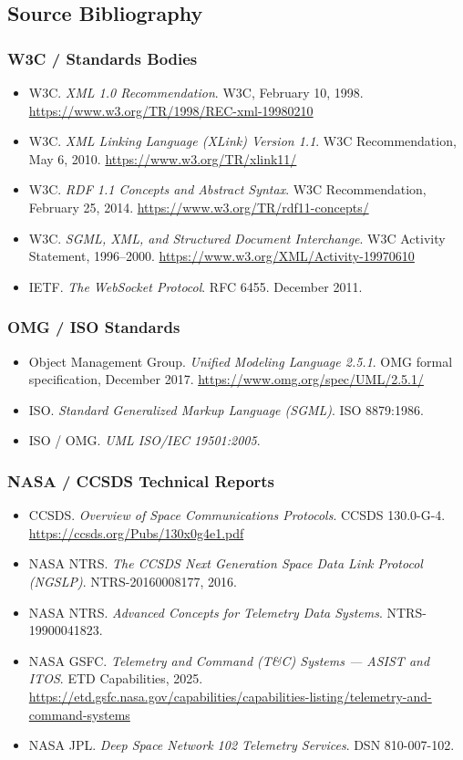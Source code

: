 \documentclass[11pt,letterpaper]{article}
\begin{document}
\subsection{Source Bibliography}

\subsubsection{W3C / Standards Bodies}
\begin{itemize}[noitemsep]
  \item W3C. \textit{XML 1.0 Recommendation}. W3C, February 10, 1998. \url{https://www.w3.org/TR/1998/REC-xml-19980210}
  \item W3C. \textit{XML Linking Language (XLink) Version 1.1}. W3C Recommendation, May 6, 2010. \url{https://www.w3.org/TR/xlink11/}
  \item W3C. \textit{RDF 1.1 Concepts and Abstract Syntax}. W3C Recommendation, February 25, 2014. \url{https://www.w3.org/TR/rdf11-concepts/}
  \item W3C. \textit{SGML, XML, and Structured Document Interchange}. W3C Activity Statement, 1996--2000. \url{https://www.w3.org/XML/Activity-19970610}
  \item IETF. \textit{The WebSocket Protocol}. RFC 6455. December 2011.
\end{itemize}

\subsubsection{OMG / ISO Standards}
\begin{itemize}[noitemsep]
  \item Object Management Group. \textit{Unified Modeling Language 2.5.1}. OMG formal specification, December 2017. \url{https://www.omg.org/spec/UML/2.5.1/}
  \item ISO. \textit{Standard Generalized Markup Language (SGML)}. ISO 8879:1986.
  \item ISO / OMG. \textit{UML ISO/IEC 19501:2005}.
\end{itemize}

\subsubsection{NASA / CCSDS Technical Reports}
\begin{itemize}[noitemsep]
  \item CCSDS. \textit{Overview of Space Communications Protocols}. CCSDS 130.0-G-4. \url{https://ccsds.org/Pubs/130x0g4e1.pdf}
  \item NASA NTRS. \textit{The CCSDS Next Generation Space Data Link Protocol (NGSLP)}. NTRS-20160008177, 2016.
  \item NASA NTRS. \textit{Advanced Concepts for Telemetry Data Systems}. NTRS-19900041823.
  \item NASA GSFC. \textit{Telemetry and Command (T\&C) Systems --- ASIST and ITOS}. ETD Capabilities, 2025. \url{https://etd.gsfc.nasa.gov/capabilities/capabilities-listing/telemetry-and-command-systems}
  \item NASA JPL. \textit{Deep Space Network 102 Telemetry Services}. DSN 810-007-102.
\end{itemize}
\end{document}

